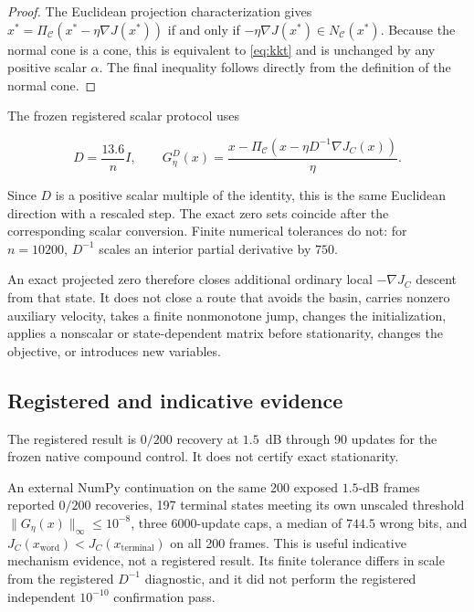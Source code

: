 \documentclass[11pt]{article}
\theoremstyle{remark}
\newcommand{\Cbox}{\mathcal{C}}
\newcommand{\proj}[2]{\Pi_{#1}\!\left(#2\right)}
\begin{document}
\begin{proof}
The Euclidean projection characterization gives
$x^*=\proj{\Cbox}{x^*-\eta\nabla J(x^*)}$ if and only if
$-\eta\nabla J(x^*)\in N_{\Cbox}(x^*)$.  Because the normal cone is a cone,
this is equivalent to \cref{eq:kkt} and is unchanged by any positive scalar
$\alpha$.  The final inequality follows directly from the definition of the
normal cone.
\end{proof}

The frozen registered scalar protocol uses

\begin{equation}
D=\frac{13.6}{n}I,
\qquad
G_\eta^D(x)=
\frac{x-\proj{\Cbox}{x-\eta D^{-1}\nabla J_C(x)}}{\eta}.
\end{equation}

Since $D$ is a positive scalar multiple of the identity, this is the same
Euclidean direction with a rescaled step.  The exact zero sets coincide after
the corresponding scalar conversion.  Finite numerical tolerances do not:
for $n=10200$, $D^{-1}$ scales an interior partial derivative by $750$.

An exact projected zero therefore closes additional ordinary local
$-\nabla J_C$ descent from that state.  It does not close a route that avoids
the basin, carries nonzero auxiliary velocity, takes a finite nonmonotone
jump, changes the initialization, applies a nonscalar or state-dependent
matrix before stationarity, changes the objective, or introduces new
variables.

\subsection{Registered and indicative evidence}

The registered result is $0/200$ recovery at $1.5$~dB through 90 updates for
the frozen native compound control.  It does not certify exact stationarity.

An external NumPy continuation on the same 200 exposed $1.5$-dB frames
reported $0/200$ recoveries, 197 terminal states meeting its own unscaled
threshold $\|G_\eta(x)\|_\infty\le 10^{-8}$, three 6000-update caps, a median
of $744.5$ wrong bits, and
$J_C(x_{\mathrm{word}})<J_C(x_{\mathrm{terminal}})$ on all 200 frames.  This
is useful indicative mechanism evidence, not a registered result.  Its finite
tolerance differs in scale from the registered $D^{-1}$ diagnostic, and it did
not perform the registered independent $10^{-10}$ confirmation pass.
\end{document}
